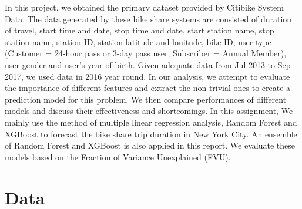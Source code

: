   \par In this project, we obtained the primary dataset provided by Citibike System Data. The data generated by these bike share systems are consisted of duration of travel, start time and date, stop time and date, start station name, stop station name, station ID, station latitude and lonitude, bike ID, user type (Customer = 24-hour pass or 3-day pass user; Subscriber = Annual Member), user gender and user's year of birth. Given adequate data from Jul 2013 to Sep 2017, we used data in 2016 year round. In our analysis, we attempt to evaluate the importance of different features and extract the non-trivial ones to create a prediction model for this problem. We then compare performances of different models and discuss their effectiveness and shortcomings. In this assignment, We mainly use the method of multiple linear regression analysis, Random Forest and XGBoost to forecast the bike share trip duration in New York City. An ensemble of Random Forest and XGBoost is also applied in this report. We evaluate these models based on the Fraction of Variance Unexplained (FVU). 

\section{Data}
